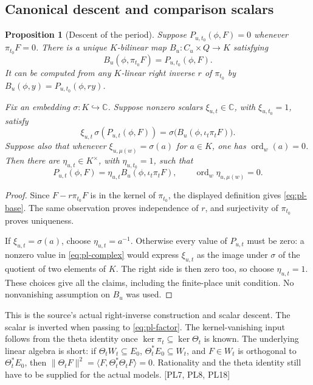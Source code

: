 \documentclass[11pt,a4paper]{article}
\numberwithin{equation}{section}
\newtheorem{proposition}[theorem]{Proposition}
\theoremstyle{remark}\newtheorem{remark}[theorem]{Remark}
\begin{document}
\subsection{Canonical descent and comparison scalars}

\begin{proposition}[Descent of the period]\label{prop:pl-descent}
Suppose $P_{u,t_0}(\phi,F)=0$ whenever $\pi_{t_0}F=0$. There is a unique $K$-bilinear map $B_u:C_u\times Q\to K$ satisfying
\begin{equation}\label{eq:pl-base}
 B_u(\phi,\pi_{t_0}F)=P_{u,t_0}(\phi,F).
\end{equation}
It can be computed from any $K$-linear right inverse $r$ of $\pi_{t_0}$ by $B_u(\phi,y)=P_{u,t_0}(\phi,ry)$.

Fix an embedding $\sigma:K\hookrightarrow\mathbb C$. Suppose nonzero scalars $\xi_{u,t}\in\mathbb C$, with $\xi_{u,t_0}=1$, satisfy
\begin{equation}\label{eq:pl-complex}
 \xi_{u,t}\,\sigma(P_{u,t}(\phi,F))
     =\sigma\bigl(B_u(\phi,\iota_t\pi_tF)\bigr).
\end{equation}
Suppose also that whenever $\xi_{u,\mu(w)}=\sigma(a)$ for $a\in K$, one has $\operatorname{ord}_w(a)=0$. Then there are $\eta_{u,t}\in K^\times$, with $\eta_{u,t_0}=1$, such that
\begin{equation}\label{eq:pl-factor}
 P_{u,t}(\phi,F)=\eta_{u,t}B_u(\phi,\iota_t\pi_tF),
 \qquad \operatorname{ord}_w\eta_{u,\mu(w)}=0.
\end{equation}
\end{proposition}

\begin{proof}
Since $F-r\pi_{t_0}F$ is in the kernel of $\pi_{t_0}$, the displayed definition gives \eqref{eq:pl-base}. The same observation proves independence of $r$, and surjectivity of $\pi_{t_0}$ proves uniqueness.

If $\xi_{u,t}=\sigma(a)$, choose $\eta_{u,t}=a^{-1}$. Otherwise every value of $P_{u,t}$ must be zero: a nonzero value in \eqref{eq:pl-complex} would express $\xi_{u,t}$ as the image under $\sigma$ of the quotient of two elements of $K$. The right side is then zero too, so choose $\eta_{u,t}=1$. These choices give all the claims, including the finite-place unit condition. No nonvanishing assumption on $B_u$ was used.
\end{proof}

This is the source's actual right-inverse construction and scalar descent. The scalar is inverted when passing to \eqref{eq:pl-factor}. The kernel-vanishing input follows from the theta identity once $\ker\pi_t\subseteq\ker\Theta_t$ is known. The underlying linear algebra is short: if $\Theta_tW_t\subseteq E_0$, $\Theta_t^*E_0\subseteq W_t$, and $F\in W_t$ is orthogonal to $\Theta_t^*E_0$, then
$\|\Theta_tF\|^2=\langle F,\Theta_t^*\Theta_tF\rangle=0$.
Rationality and the theta identity still have to be supplied for the actual models. \textsf{[PL7, PL8, PL18]}
\end{document}
